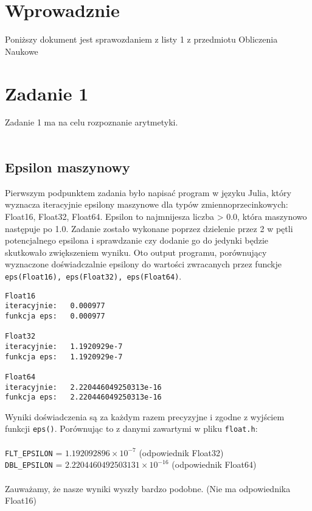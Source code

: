 \documentclass{article}
\begin{document}
\section*{Wprowadznie}
Poniższy dokument jest sprawozdaniem z listy 1 z przedmiotu Obliczenia Naukowe

\section{Zadanie 1}
\noindent Zadanie 1 ma na celu rozpoznanie arytmetyki. \\\\
\subsection{Epsilon maszynowy}
Pierwszym podpunktem zadania było napisać program w języku Julia, który wyznacza iteracyjnie epsilony maszynowe dla typów zmiennoprzecinkowych: Float16, Float32, Float64. Epsilon to najmnijesza liczba > 0.0, która maszynowo następuje po 1.0. Zadanie zostało wykonane poprzez dzielenie przez 2 w pętli potencjalnego epsilona i sprawdzanie czy dodanie go do jedynki będzie skutkowało zwiększeniem wyniku. Oto output programu, porównujący wyznaczone doświadczalnie epsilony do wartości zwracanych przez funckje \texttt{eps(Float16), eps(Float32), eps(Float64)}. \\ 
\begin{verbatim}
Float16
iteracyjnie:   0.000977
funkcja eps:   0.000977

Float32
iteracyjnie:   1.1920929e-7
funkcja eps:   1.1920929e-7

Float64
iteracyjnie:   2.220446049250313e-16
funkcja eps:   2.220446049250313e-16

\end{verbatim}


\noindent Wyniki doświadczenia są za każdym razem precyzyjne i zgodne z wyjściem funkcji \texttt{eps()}. Porównując to z danymi zawartymi w pliku \texttt{float.h}: \\\\
\texttt{FLT\_EPSILON} = $1.192092896 \times 10^{-7}$ (odpowiednik Float32) \\ 
\texttt{DBL\_EPSILON} = $2.2204460492503131 \times 10^{-16}$ (odpowiednik Float64) \\\\
Zauważamy, że nasze wyniki wyszły bardzo podobne. (Nie ma odpowiednika Float16)
\end{document}
